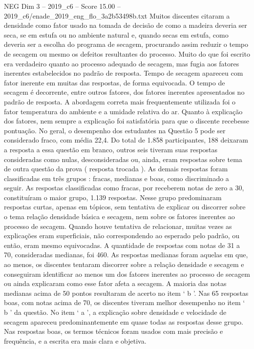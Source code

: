 \begin{textsample}{NEG Dim 3 – 2019\_c6 – Score 15.00 – 2019\_c6/enade\_2019\_eng\_flo\_3a2b53498b.txt}
Muitos discentes citaram a densidade como fator usado na tomada de decisão de como a madeira deveria ser seca, se em estufa ou no ambiente natural e, quando secas em estufa, como deveria ser a escolha do programa de secagem, procurando assim reduzir o tempo de secagem ou mesmo os defeitos resultantes do processo.
Muito do que foi escrito era verdadeiro quanto ao processo adequado de secagem, mas fugia aos fatores inerentes estabelecidos no padrão de resposta.
Tempo de secagem apareceu com fator inerente em muitas das respostas, de forma equivocada.
O tempo de secagem é decorrente, entre outros fatores, dos fatores inerentes apresentados no padrão de resposta.
A abordagem correta mais frequentemente utilizada foi o fator temperatura do ambiente e a umidade relativa do ar.
Quanto à explicação dos fatores, nem sempre a explicação foi satisfatória para que o discente recebesse pontuação.
No geral, o desempenho dos estudantes na Questão 5 pode ser considerado fraco, com média 22,4.
Do total de 1.858 participantes, 188 deixaram a resposta a essa questão em branco, outros seis tiveram suas respostas consideradas como nulas, desconsideradas ou, ainda, eram respostas sobre tema de outra questão da prova ( resposta trocada ).
As demais respostas foram classificadas em três grupos : fracas, medianas e boas, como discriminado a seguir.
As respostas classificadas como fracas, por receberem notas de zero a 30, constituíram o maior grupo, 1.139 respostas.
Nesse grupo predominaram respostas curtas, apenas em tópicos, sem tentativa de explicar ou discorrer sobre o tema relação densidade básica e secagem, nem sobre os fatores inerentes ao processo de secagem.
Quando houve tentativa de relacionar, muitas vezes as explicações eram superficiais, não correspondendo ao esperado pelo padrão, ou então, eram mesmo equivocadas.
A quantidade de respostas com notas de 31 a 70, consideradas medianas, foi 460.
As respostas medianas foram aquelas em que, ao menos, os discentes tentaram discorrer sobre a relação densidade e secagem e conseguiram identificar ao menos um dos fatores inerentes ao processo de secagem ou ainda explicaram como esse fator afeta a secagem.
A maioria das notas medianas acima de 50 pontos resultaram de acerto no item ‘ b ’.
Nas 65 respostas boas, com notas acima de 70, os discentes tiveram melhor desempenho no item ‘ b ’ da questão.
No item ‘ a ’, a explicação sobre densidade e velocidade de secagem apareceu predominantemente em quase todas as respostas desse grupo.
Nas respostas boas, os termos técnicos foram usados com mais precisão e frequência, e a escrita era mais clara e objetiva.

\end{textsample}
